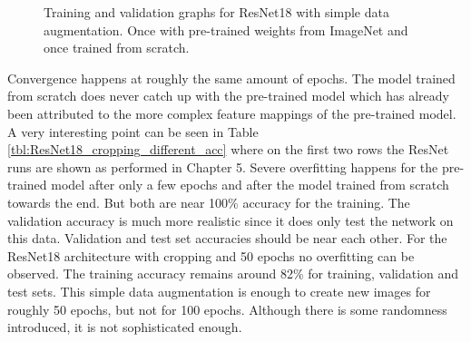 \begin{figure}[h]
\centering
\caption{Training and validation graphs for ResNet18 with simple data augmentation. Once with pre-trained weights from ImageNet and once trained from scratch.}
\label{fig:resnet18-da-graph}
\end{figure}

Convergence happens at roughly the same amount of epochs. The model trained from scratch does never catch up with the pre-trained model which has already been attributed to the more complex feature mappings of the pre-trained model. A very interesting point can be seen in Table \ref{tbl:ResNet18_cropping_different_acc} where on the first two rows the ResNet runs are shown as performed in Chapter 5. Severe overfitting happens for the pre-trained model after only a few epochs and after the model trained from scratch towards the end. But both are near 100\% accuracy for the training. The validation accuracy is much more realistic since it does only test the network on this data. Validation and test set accuracies should be near each other. For the ResNet18 architecture with cropping and 50 epochs no overfitting can be observed. The training accuracy remains around 82\% for training, validation and test sets. This simple data augmentation is enough to create new images for roughly 50 epochs, but not for 100 epochs. Although there is some randomness introduced, it is not sophisticated enough.

